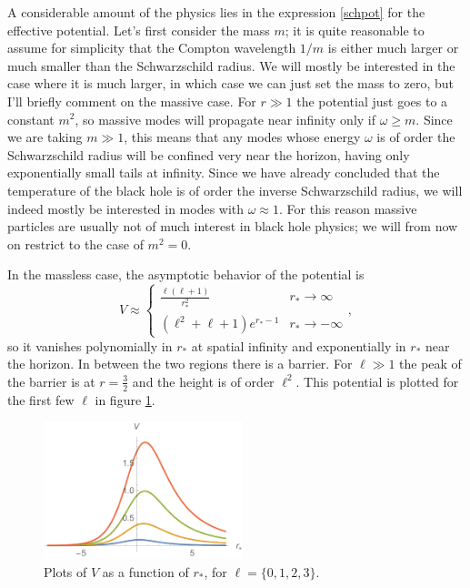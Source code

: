\documentclass[12pt]{article}
\newcommand{\be}{\begin{equation}}
\newcommand{\ee}{\end{equation}}
\begin{document}
A considerable amount of the physics lies in the expression \eqref{schpot} for the effective potential.  Let's first consider the mass $m$; it is quite reasonable to assume for simplicity that the Compton wavelength $1/m$ is either much larger or much smaller than the Schwarzschild radius.  We will mostly be interested in the case where it is much larger, in which case we can just set the mass to zero, but I'll briefly comment on the massive case.  For $r\gg 1$ the potential just goes to a constant $m^2$, so massive modes will propagate near infinity only if $\omega \geq m$.  Since we are taking $m\gg 1$, this means that any modes whose energy $\omega$ is of order the Schwarzschild radius will be confined very near the horizon, having only exponentially small tails at infinity.  Since we have already concluded that the temperature of the black hole is of order the inverse Schwarzschild radius, we will indeed mostly be interested in modes with $\omega\approx 1$.  For this reason massive particles are usually not of much interest in black hole physics; we will from now on restrict to the case of $m^2=0$.  

In the massless case, the asymptotic behavior of the potential is
\be
V\approx
\begin{cases}
\frac{\ell(\ell+1)}{r_*^2} & r_*\to \infty\\
(\ell^2+\ell+1)e^{r_*-1} & r_* \to -\infty
\end{cases},
\ee
so it vanishes polynomially in $r_*$ at spatial infinity and exponentially in $r_*$ near the horizon.  In between the two regions there is a barrier.  For $\ell \gg 1$ the peak of the barrier is at $r=\frac{3}{2}$ and the height is of order $\ell^2$.  This potential is plotted for the first few $\ell$ in figure \ref{potentials}.
\begin{figure}
\begin{center}
\includegraphics[height=4cm]{potentials.pdf}
\caption{Plots of $V$ as a function of $r_*$, for $\ell=\{0,1,2,3\}$.}\label{potentials} 
\end{center}
\end{figure}
\end{document}
